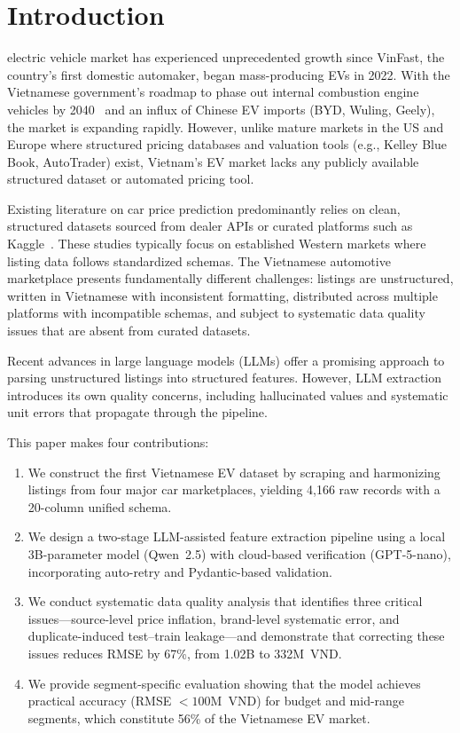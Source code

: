 \documentclass[lettersize,journal]{IEEEtran}
\begin{document}
\section{Introduction}
 electric vehicle market has experienced
unprecedented growth since VinFast, the country's first domestic automaker,
began mass-producing EVs in 2022. With the Vietnamese government's roadmap to
phase out internal combustion engine vehicles by 2040~\cite{vn_ev_policy} and
an influx of Chinese EV imports (BYD, Wuling, Geely), the market is expanding
rapidly. However, unlike mature markets in the US and Europe where structured
pricing databases and valuation tools (e.g., Kelley Blue Book, AutoTrader)
exist, Vietnam's EV market lacks any publicly available structured dataset or
automated pricing tool.

Existing literature on car price prediction predominantly relies on clean,
structured datasets sourced from dealer APIs or curated platforms such as
Kaggle~\cite{vw_price, gegic2019}. These studies typically focus on
established Western markets where listing data follows standardized schemas.
The Vietnamese automotive marketplace presents fundamentally different
challenges: listings are unstructured, written in Vietnamese with
inconsistent formatting, distributed across multiple platforms with
incompatible schemas, and subject to systematic data quality issues that are
absent from curated datasets.

Recent advances in large language models (LLMs) offer a promising approach
to parsing unstructured listings into structured features. However, LLM
extraction introduces its own quality concerns, including hallucinated
values and systematic unit errors that propagate through the pipeline.

This paper makes four contributions:
\begin{enumerate}
    \item We construct the first Vietnamese EV dataset by scraping and
    harmonizing listings from four major car marketplaces, yielding 4,166 raw
    records with a 20-column unified schema.
    \item We design a two-stage LLM-assisted feature extraction pipeline
    using a local 3B-parameter model (Qwen~2.5) with cloud-based
    verification (GPT-5-nano), incorporating auto-retry and Pydantic-based
    validation.
    \item We conduct systematic data quality analysis that identifies three
    critical issues---source-level price inflation, brand-level systematic
    error, and duplicate-induced test--train leakage---and demonstrate that
    correcting these issues reduces RMSE by 67\%, from 1.02B to 332M~VND.
    \item We provide segment-specific evaluation showing that the model
    achieves practical accuracy (RMSE $< 100$M~VND) for budget and mid-range
    segments, which constitute 56\% of the Vietnamese EV market.
\end{enumerate}
\end{document}
